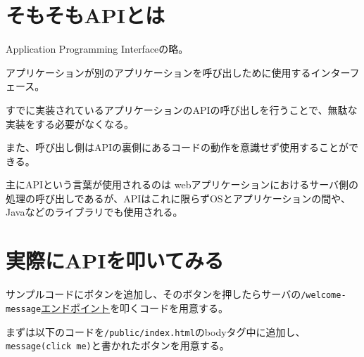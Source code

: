 \section{そもそもAPIとは}\label{ux305dux3082ux305dux3082apiux3068ux306f}

Application Programming Interfaceの略。

アプリケーションが別のアプリケーションを呼び出しために使用するインターフェース。

すでに実装されているアプリケーションのAPIの呼び出しを行うことで、無駄な実装をする必要がなくなる。

また、呼び出し側はAPIの裏側にあるコードの動作を意識せず使用することができる。

主にAPIという言葉が使用されるのは
webアプリケーションにおけるサーバ側の処理の呼び出しであるが、APIはこれに限らずOSとアプリケーションの間や、Javaなどのライブラリでも使用される。

\section{実際にAPIを叩いてみる}\label{ux5b9fux969bux306bapiux3092ux53e9ux3044ux3066ux307fux308b}

サンプルコードにボタンを追加し、そのボタンを押したらサーバの\texttt{/welcome-message}\hyperref[tipsux5cux25E3ux5cux2582ux5cux25A8ux5cux25E3ux5cux2583ux5cux25B3ux5cux25E3ux5cux2583ux5cux2589ux5cux25E3ux5cux2583ux5cux259Dux5cux25E3ux5cux2582ux5cux25A4ux5cux25E3ux5cux2583ux5cux25B3ux5cux25E3ux5cux2583ux5cux2588]{エンドポイント}を叩くコードを用意する。

まずは以下のコードを\texttt{/public/index.html}のbodyタグ中に追加し、\texttt{message(click\ me)}と書かれたボタンを用意する。

\begin{Shaded}
\begin{Highlighting}[]
  \DataTypeTok{\textless{}}\DataTypeTok{\textgreater{}}
    \DataTypeTok{\textless{}}\OperatorTok{=}\DataTypeTok{\textgreater{}\textless{}/}\DataTypeTok{\textgreater{}}
    \DataTypeTok{\textless{}}\OperatorTok{=}\DataTypeTok{\textgreater{}}\DataTypeTok{\textless{}/}\DataTypeTok{\textgreater{}}
  \DataTypeTok{\textless{}/}\DataTypeTok{\textgreater{}}
\end{Highlighting}
\end{Shaded}

